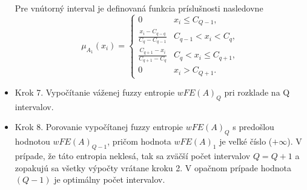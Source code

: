 \begin{itemize}
Pre vnútorný interval je definovaná funkcia príslušnosti nasledovne 
$$\mu_{A_1}(x_i) = 
\begin{cases}
0 & x_i \leq  C_{Q-1},
\\
\frac{x_i-C_{q-q}}{C_q-C_{q-1}} & C_{q-1} < x_i < C_q, 
\\
\frac{C_{q+1}-x_i}{C_{q+1}-C_q} 
& C_q < x_i \leq C_{q+1},
\\0 & x_i >  C_{Q+1}.
\end{cases}
    $$
 
\item[]{Krok 7.} 
 Vypočítanie váženej fuzzy entropie $wFE(A)_Q$ pri rozklade na Q intervalov. 
 
 \item[]{Krok 8.} 
 Porovanie vypočítanej fuzzy entropie $wFE(A)_Q$ s predošlou hodnotou $wFE(A)_{Q-1}$, pričom hodnota $wFE(A)_1$ je veľké číslo ($+\infty$). 
 V prípade, že táto entropia neklesá, tak sa zväčší počet intervalov $Q=Q+1$ a zopakujú sa všetky výpočty vrátane kroku 2. 
 V opačnom prípade hodnota $(Q-1)$ je optimálny počet intervalov. 
\end{itemize}












